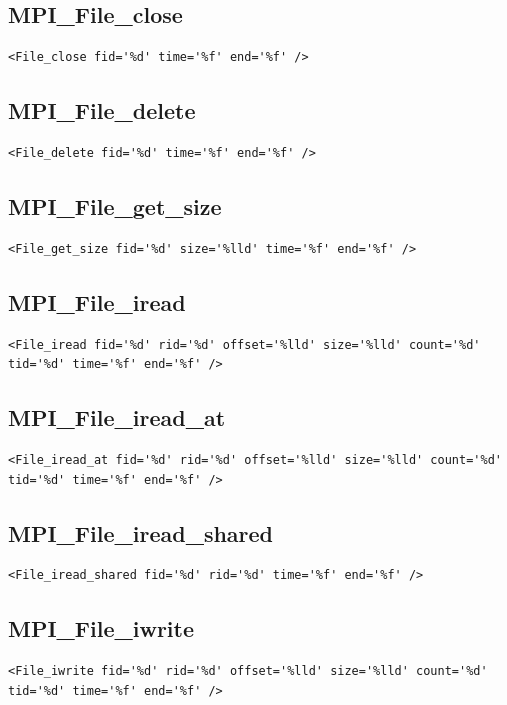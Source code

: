 \documentclass[a4paper,12pt,pdftex]{scrartcl}
\begin{document}
\subsection{MPI\_File\_close}
\begin{lstlisting}
<File_close fid='%d' time='%f' end='%f' />
\end{lstlisting}

\subsection{MPI\_File\_delete}
\begin{lstlisting}
<File_delete fid='%d' time='%f' end='%f' />
\end{lstlisting}

\subsection{MPI\_File\_get\_size}
\begin{lstlisting}
<File_get_size fid='%d' size='%lld' time='%f' end='%f' />
\end{lstlisting}

\subsection{MPI\_File\_iread}
\begin{lstlisting}
<File_iread fid='%d' rid='%d' offset='%lld' size='%lld' count='%d' tid='%d' time='%f' end='%f' />
\end{lstlisting}

\subsection{MPI\_File\_iread\_at}
\begin{lstlisting}
<File_iread_at fid='%d' rid='%d' offset='%lld' size='%lld' count='%d' tid='%d' time='%f' end='%f' />
\end{lstlisting}

\subsection{MPI\_File\_iread\_shared}
\begin{lstlisting}
<File_iread_shared fid='%d' rid='%d' time='%f' end='%f' />
\end{lstlisting}

\subsection{MPI\_File\_iwrite}
\begin{lstlisting}
<File_iwrite fid='%d' rid='%d' offset='%lld' size='%lld' count='%d' tid='%d' time='%f' end='%f' />
\end{lstlisting}
\end{document}
